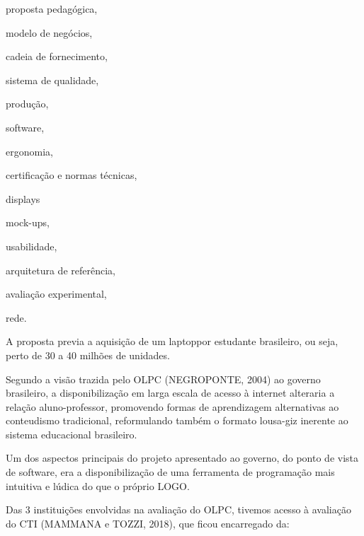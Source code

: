 \documentclass[
12pt,		%
openright,	%
twoside,  %
a4paper,			%
chapter=TITLE,		%
english,			%
french,				%
spanish,			%
brazil				%
]{USPSC-classe/USPSC}
\begin{document}
\begin{alineas}
\item proposta pedag\'ogica,
\item modelo de neg\'ocios,
\item cadeia de fornecimento,
\item sistema de qualidade,
\item produ\c{c}\~ao,
\item software,
\item ergonomia,
\item certifica\c{c}\~ao e normas t\'ecnicas,
\item displays
\item mock-ups,
\item usabilidade,
\item arquitetura de refer\^encia,
\item avalia\c{c}\~ao experimental,
\item rede.
\end{alineas}

A proposta previa a aquisi\c{c}\~ao de um \textquotedbl laptop\textquotedbl  por estudante brasileiro, ou seja, perto de 30 a 40 milh\~oes de unidades.




Segundo a vis\~ao trazida pelo OLPC  (NEGROPONTE, 2004) ao governo brasileiro, a disponibiliza\c{c}\~ao em larga escala de acesso \`a internet alteraria a rela\c{c}\~ao aluno-professor, promovendo formas de aprendizagem alternativas ao conteudismo tradicional, reformulando tamb\'em o formato lousa-giz inerente ao sistema educacional brasileiro.




Um dos aspectos principais do projeto apresentado ao governo, do ponto de vista de software, era a disponibiliza\c{c}\~ao de uma ferramenta de programa\c{c}\~ao mais intuitiva e l\'udica do que o pr\'oprio LOGO.




Das 3 institui\c{c}\~oes envolvidas na avalia\c{c}\~ao do OLPC, tivemos acesso \`a avalia\c{c}\~ao do CTI  (MAMMANA e TOZZI, 2018), que ficou encarregado da:
\end{document}
